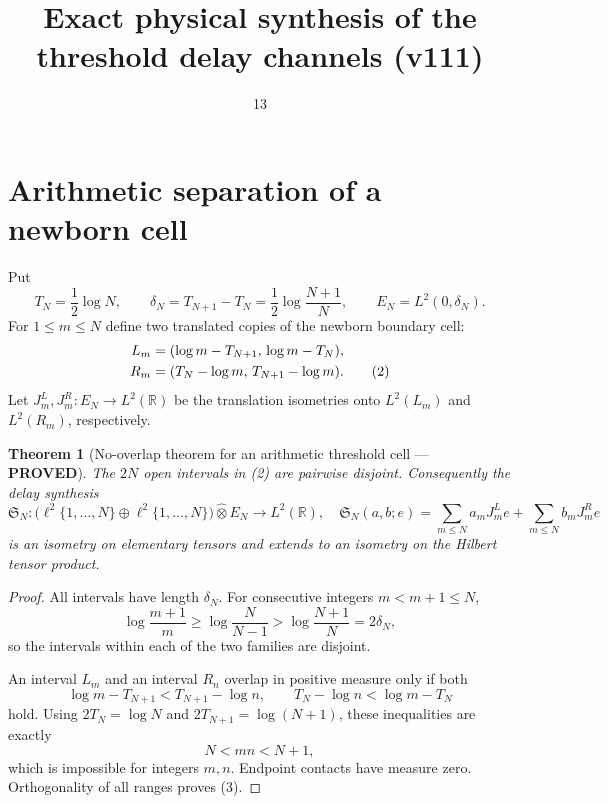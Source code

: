 \documentclass[11pt]{article}
\title{Exact physical synthesis of the threshold delay channels (v111)}
\date{13}
\newcommand{\PROVED}{\textcolor{green!40!black}{\textbf{PROVED}}}
\newtheorem{theorem}{Theorem}
\begin{document}
\maketitle

\section{Arithmetic separation of a newborn cell}

Put
\begin{equation}
 T_N=\frac12\log N,
 \qquad
 \delta_N=T_{N+1}-T_N=\frac12\log\frac{N+1}{N},
 \qquad E_N=L^2(0,\delta_N).                                  \tag{1}
\end{equation}
For $1\le m\le N$ define two translated copies of the newborn boundary
cell:
\begin{align}
 L_m&=(\log m-T_{N+1},\,\log m-T_N),\notag\\
 R_m&=(T_N-\log m,\,T_{N+1}-\log m).                          \tag{2}
\end{align}
Let $J_m^L,J_m^R:E_N\to L^2(\mathbb R)$ be the translation isometries onto
$L^2(L_m)$ and $L^2(R_m)$, respectively.

\begin{theorem}[No-overlap theorem for an arithmetic threshold cell ---
\PROVED]
The $2N$ open intervals in (2) are pairwise disjoint.  Consequently the
delay synthesis
\begin{equation}
 \mathfrak S_N:
 \bigl(\ell^2\{1,\ldots,N\}\oplus\ell^2\{1,\ldots,N\}\bigr)
       \widehat\otimes E_N\longrightarrow L^2(\mathbb R),
\quad
 \mathfrak S_N(a,b;e)=
 \sum_{m\le N}a_mJ_m^Le+\sum_{m\le N}b_mJ_m^Re               \tag{3}
\end{equation}
is an isometry on elementary tensors and extends to an isometry on the
Hilbert tensor product.
\end{theorem}

\begin{proof}
All intervals have length $\delta_N$.  For consecutive integers
$m<m+1\le N$,
\[
 \log\frac{m+1}{m}\ge\log\frac N{N-1}
 >\log\frac{N+1}{N}=2\delta_N,
\]
so the intervals within each of the two families are disjoint.

An interval $L_m$ and an interval $R_n$ overlap in positive measure only
if both
\[
 \log m-T_{N+1}<T_{N+1}-\log n,
 \qquad
 T_N-\log n<\log m-T_N
\]
hold.  Using $2T_N=\log N$ and $2T_{N+1}=\log(N+1)$, these inequalities
are exactly
\[
                             N<mn<N+1,
\]
which is impossible for integers $m,n$.  Endpoint contacts have measure
zero.  Orthogonality of all ranges proves (3).
\end{proof}
\end{document}
